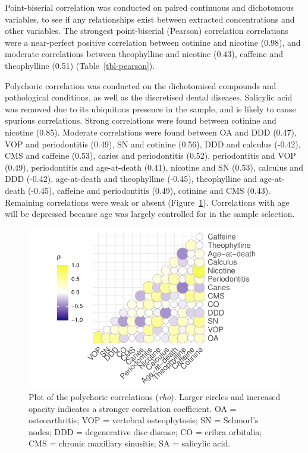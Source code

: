 \documentclass[
]{article}
\begin{document}
Point-biserial correlation was conducted on paired continuous and
dichotomous variables, to see if any relationships exist between
extracted concentrations and other variables. The strongest
point-biserial (Pearson) correlation correlations were a near-perfect
positive correlation between cotinine and nicotine (0.98), and moderate
correlations between theophylline and nicotine (0.43), caffeine and
theophylline (0.51) (Table~\ref{tbl-pearson}).

Polychoric correlation was conducted on the dichotomised compounds and
pathological conditions, as well as the discretised dental diseases.
Salicylic acid was removed due to its ubiquitous presence in the sample,
and is likely to cause spurious correlations. Strong correlations were
found between cotinine and nicotine (0.85). Moderate correlations were
found between OA and DDD (0.47), VOP and periodontitis (0.49), SN and
cotinine (0.56), DDD and calculus (-0.42), CMS and caffeine (0.53),
caries and periodontitis (0.52), periodontitis and VOP (0.49),
periodontitis and age-at-death (0.41), nicotine and SN (0.53), calculus
and DDD (-0.42), age-at-death and theophylline (-0.45), theophylline and
age-at-death (-0.45), caffeine and periodontitis (0.49), cotinine and
CMS (0.43). Remaining correlations were weak or absent
(Figure~\ref{fig-polycorr}). Correlations with age will be depressed
because age was largely controlled for in the sample selection.

\begin{figure}

{\centering \includegraphics{paper_files/figure-pdf/fig-polycorr-1.pdf}

}

\caption{\label{fig-polycorr}Plot of the polychoric correlations
(\emph{rho}). Larger circles and increased opacity indicates a stronger
correlation coefficient. OA = osteoarthritis; VOP = vertebral
osteophytosis; SN = Schmorl's nodes; DDD = degenerative disc disease; CO
= cribra orbitalia; CMS = chronic maxillary sinusitis; SA = salicylic
acid.}

\end{figure}
\end{document}
